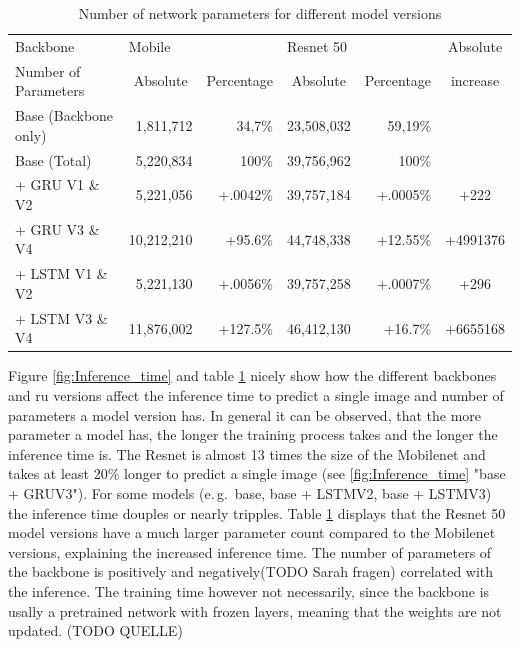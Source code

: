 \documentclass[11pt,
  paper=a4, 
  bibliography=totocnumbered,
	captions=tableheading,
	BCOR=10mm
]{scrreprt}
\theoremstyle{definition}
\newcommand{\eg}{e.\,g.~}
\newcommand{\tableref}[1]{Table \ref{#1}}
\begin{document}
\begin{table}[ht]
	\centering
	\renewcommand\arraystretch{1.2}
	\begin{tabular}{|l||r|r|r|r|c|}
		\toprule
		{Backbone} 				& \multicolumn{2}{l|}{Mobile} 	& 									\multicolumn{2}{l|}{Resnet 50} 										&Absolute\\ %
		\cmidrule{1-5}
		Number of Parameters 	& \multicolumn{1}{c|}{Absolute} & \multicolumn{1}{c|}{Percentage} &	\multicolumn{1}{c|}{Absolute} 	&	\multicolumn{1}{c|}{Percentage} &increase\\
		\midrule
		Base (Backbone only)	&	1,811,712 &	34,7\%	&	23,508,032	 	&59,19\%	& 				\\
		Base (Total)           	&   5,220,834 &	100\%    &	39,756,962	 	&100\% 		& 				\\
		+ GRU V1 \& V2     		&   5,221,056 &	+.0042\% &	39,757,184		&+.0005\% 	& +222			\\
		+ GRU V3  \& V4  		&  10,212,210 &	+95.6\%	&	44,748,338		&+12.55\%	& +4991376  	\\
		+ LSTM V1 \& V2  		&   5,221,130 &	+.0056\% &	39,757,258		&+.0007\% 	& +296			\\
		+ LSTM V3 \& V4 		&  11,876,002 &	+127.5\% &	46,412,130		&+16.7\% 	& +6655168		\\
		\bottomrule						
	\end{tabular}
	\caption[Network parameters]{Number of network parameters for different model versions}\label{tab:parameters}
\end{table}

Figure \ref{fig:Inference_time} and table \ref{tab:parameters} nicely show how the different backbones and \gls{ru} versions affect the inference time to predict a single image and number of parameters a model version has.
In general it can be observed, that the more parameter a model has, the longer the training process takes and the longer the inference time is.
The Resnet is almost 13 times the size of the Mobilenet and takes at least 20\% longer to predict a single image (see \ref{fig:Inference_time} "base + GRUV3").
For some models (\eg base, base + LSTMV2, base + LSTMV3) the inference time douples or nearly tripples.
\tableref{tab:parameters} displays that the Resnet 50 model versions have a much larger parameter count compared to the Mobilenet versions, explaining the increased inference time.
The number of parameters of the backbone is positively and negatively(TODO Sarah fragen) correlated with the inference.
The training time however not necessarily, since the backbone is usally a pretrained network with frozen layers, meaning that the weights are not updated. (TODO QUELLE)
\end{document}
